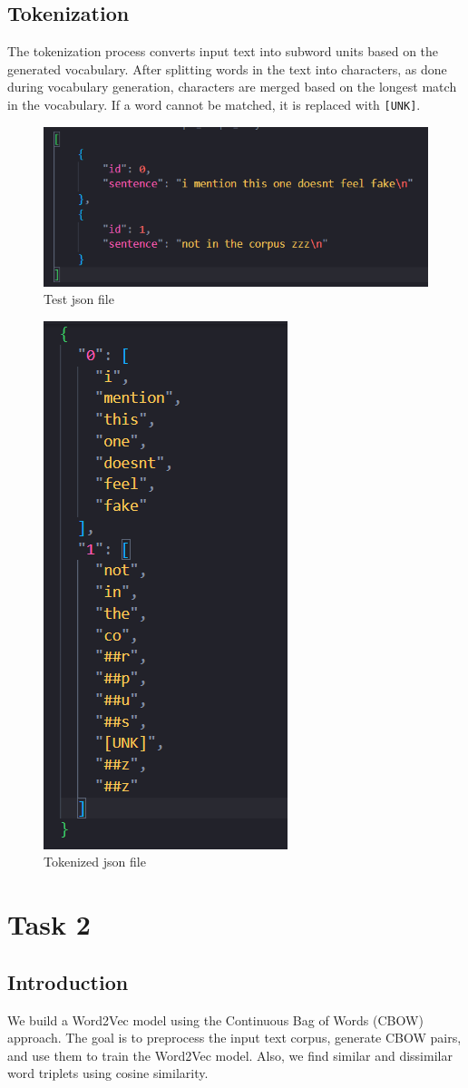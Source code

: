 \documentclass{article}
\begin{document}
\subsection{Tokenization}
The tokenization process converts input text into subword units based on the generated vocabulary. After splitting words in the text into characters, as done during vocabulary generation, characters are merged based on the longest match in the vocabulary. If a word cannot be matched, it is replaced with \texttt{[UNK]}.

\begin{figure}[H]
    \centering
    \includegraphics[width=0.5\linewidth]{image5.png}
    \caption{Test json file}
    \label{fig:enter-task1}
\end{figure}
\begin{figure}[H]
    \centering
    \includegraphics[width=0.25\linewidth]{image6.png}
    \caption{Tokenized json file}
    \label{fig:enter-task1}
\end{figure}

\section{Task 2}

\subsection{Introduction}

We build a Word2Vec model using the Continuous Bag of Words (CBOW) approach. The goal is to preprocess the input text corpus, generate CBOW pairs, and use them to train the Word2Vec model. Also, we find similar and dissimilar word triplets using cosine similarity.
\end{document}
